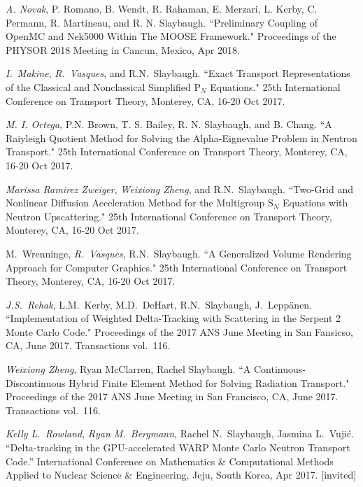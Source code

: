 \begin{bibsection}
\item \textit{A. Novak}, P. Romano, B. Wendt, R. Rahaman, E. Merzari, L. Kerby, C. Permann, R. Martineau, and R. N. Slaybaugh. ``Preliminary Coupling of OpenMC and Nek5000 Within The MOOSE Framework." Proceedings of the PHYSOR 2018 Meeting in Cancun, Mexico, Apr 2018. 

\item  \textit{I.\ Makine}, \textit{R.\ Vasques}, and R.N.\ Slaybaugh. ``Exact Transport Representations of the Classical and Nonclassical Simplified P$_N$ Equations." 25th International Conference on Transport Theory, Monterey, CA, 16-20 Oct 2017.

\item \textit{M. I. Ortega}, P.N. Brown, T. S. Bailey, R. N. Slaybaugh, and B. Chang. ``A Raiyleigh Quotient Method for Solving the Alpha-Eignevalue Problem in Neutron Transport." 25th International Conference on Transport Theory, Monterey, CA, 16-20 Oct 2017.

\item  \textit{Marissa Ramirez Zweiger}, \textit{Weixiong Zheng}, and R.N.\ Slaybaugh. ``Two-Grid and Nonlinear Diffusion Acceleration Method for the Multigroup S$_N$ Equations with Neutron Upscattering." 25th International Conference on Transport Theory, Monterey, CA, 16-20 Oct 2017.

\item M.\ Wrenninge, \textit{R.\ Vasques}, R.N.\ Slaybaugh. ``A Generalized Volume Rendering Approach for Computer Graphics." 25th International Conference on Transport Theory, Monterey, CA, 16-20 Oct 2017.

\item \textit{J.S.\ Rehak}, L.M.\ Kerby, M.D.\ DeHart, R.N.\ Slaybaugh, J.\ Lepp\"{a}nen. ``Implementation of Weighted Delta-Tracking with Scattering in the Serpent 2 Monte Carlo Code." Proceedings of the 2017 ANS June Meeting in San Fansicso, CA, June 2017. Transactions vol.\ 116.

\item\textit{ Weixiong Zheng}, Ryan McClarren, Rachel Slaybaugh. ``A Continuous-Discontinuous Hybrid Finite Element Method for Solving Radiation Transport." Proceedings of the 2017 ANS June Meeting in San Francisco, CA, June 2017. Transactions vol.\ 116.

\item \textit{Kelly L.\ Rowland}, \textit{Ryan M.\ Bergmann}, Rachel N.\ Slaybaugh, Jasmina L.\ Vuji\'c. ``Delta-tracking in the GPU-accelerated WARP Monte Carlo Neutron Transport Code.'' International Conference on Mathematics \& Computational Methods Applied to Nuclear Science \& Engineering, Jeju, South Korea, Apr 2017. [invited]


\end{bibsection}
